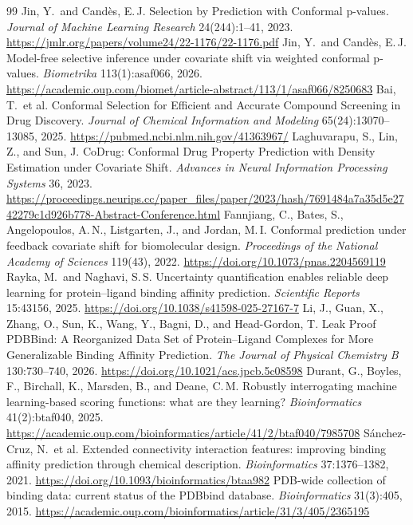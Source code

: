 \documentclass[10pt,twocolumn]{article}
\begin{document}
\begin{thebibliography}{99}
\small
{} Jin, Y.\ and Cand{\`e}s, E.\,J. Selection by Prediction with Conformal p-values. \emph{Journal of Machine Learning Research} 24(244):1--41, 2023. \url{https://jmlr.org/papers/volume24/22-1176/22-1176.pdf}
 Jin, Y.\ and Cand{\`e}s, E.\,J. Model-free selective inference under covariate shift via weighted conformal p-values. \emph{Biometrika} 113(1):asaf066, 2026. \url{https://academic.oup.com/biomet/article-abstract/113/1/asaf066/8250683}
 Bai, T.\ et al. Conformal Selection for Efficient and Accurate Compound Screening in Drug Discovery. \emph{Journal of Chemical Information and Modeling} 65(24):13070--13085, 2025. \url{https://pubmed.ncbi.nlm.nih.gov/41363967/}
 Laghuvarapu, S., Lin, Z., and Sun, J. CoDrug: Conformal Drug Property Prediction with Density Estimation under Covariate Shift. \emph{Advances in Neural Information Processing Systems} 36, 2023. \url{https://proceedings.neurips.cc/paper_files/paper/2023/hash/7691484a7a35d5e2742279c1d926b778-Abstract-Conference.html}
 Fannjiang, C., Bates, S., Angelopoulos, A.\,N., Listgarten, J., and Jordan, M.\,I. Conformal prediction under feedback covariate shift for biomolecular design. \emph{Proceedings of the National Academy of Sciences} 119(43), 2022. \url{https://doi.org/10.1073/pnas.2204569119}
 Rayka, M.\ and Naghavi, S.\,S. Uncertainty quantification enables reliable deep learning for protein--ligand binding affinity prediction. \emph{Scientific Reports} 15:43156, 2025. \url{https://doi.org/10.1038/s41598-025-27167-7}
 Li, J., Guan, X., Zhang, O., Sun, K., Wang, Y., Bagni, D., and Head-Gordon, T. Leak Proof PDBBind: A Reorganized Data Set of Protein--Ligand Complexes for More Generalizable Binding Affinity Prediction. \emph{The Journal of Physical Chemistry B} 130:730--740, 2026. \url{https://doi.org/10.1021/acs.jpcb.5c08598}
 Durant, G., Boyles, F., Birchall, K., Marsden, B., and Deane, C.\,M. Robustly interrogating machine learning-based scoring functions: what are they learning? \emph{Bioinformatics} 41(2):btaf040, 2025. \url{https://academic.oup.com/bioinformatics/article/41/2/btaf040/7985708}
 S{\'a}nchez-Cruz, N.\ et al. Extended connectivity interaction features: improving binding affinity prediction through chemical description. \emph{Bioinformatics} 37:1376--1382, 2021. \url{https://doi.org/10.1093/bioinformatics/btaa982}
 PDB-wide collection of binding data: current status of the PDBbind database. \emph{Bioinformatics} 31(3):405, 2015. \url{https://academic.oup.com/bioinformatics/article/31/3/405/2365195}
\end{thebibliography}
\end{document}
